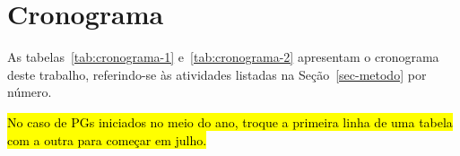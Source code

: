 
\section{Cronograma}
\label{sec-cronograma}

As tabelas~\ref{tab:cronograma-1} e~\ref{tab:cronograma-2} apresentam o cronograma deste trabalho, referindo-se às atividades listadas na Seção~\ref{sec-metodo} por número.

\hl{No caso de PGs iniciados no meio do ano, troque a primeira linha de uma tabela com a outra para começar em julho.}

\begin{table}[htb]
	\centering
	\caption{Cronograma de Atividades do primeiro semestre.}
	\label{tab:cronograma-1}
\end{table}

